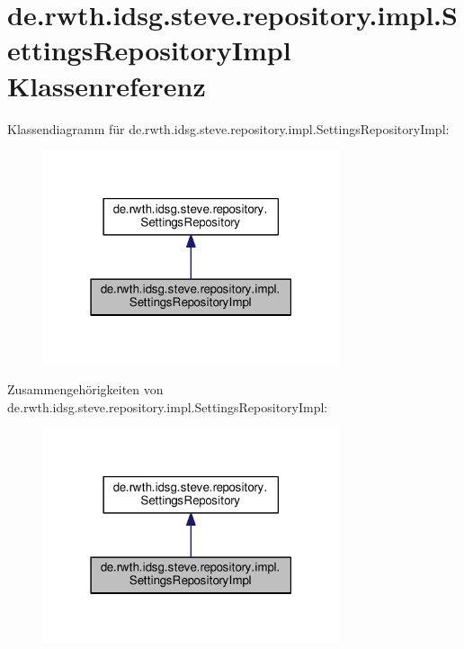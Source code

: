 \hypertarget{classde_1_1rwth_1_1idsg_1_1steve_1_1repository_1_1impl_1_1_settings_repository_impl}{\section{de.\+rwth.\+idsg.\+steve.\+repository.\+impl.\+Settings\+Repository\+Impl Klassenreferenz}
\label{classde_1_1rwth_1_1idsg_1_1steve_1_1repository_1_1impl_1_1_settings_repository_impl}
}


Klassendiagramm für de.\+rwth.\+idsg.\+steve.\+repository.\+impl.\+Settings\+Repository\+Impl\+:\nopagebreak
\begin{figure}[H]
\begin{center}
\leavevmode
\includegraphics[width=247pt]{classde_1_1rwth_1_1idsg_1_1steve_1_1repository_1_1impl_1_1_settings_repository_impl__inherit__graph}
\end{center}
\end{figure}


Zusammengehörigkeiten von de.\+rwth.\+idsg.\+steve.\+repository.\+impl.\+Settings\+Repository\+Impl\+:\nopagebreak
\begin{figure}[H]
\begin{center}
\leavevmode
\includegraphics[width=247pt]{classde_1_1rwth_1_1idsg_1_1steve_1_1repository_1_1impl_1_1_settings_repository_impl__coll__graph}
\end{center}
\end{figure}
